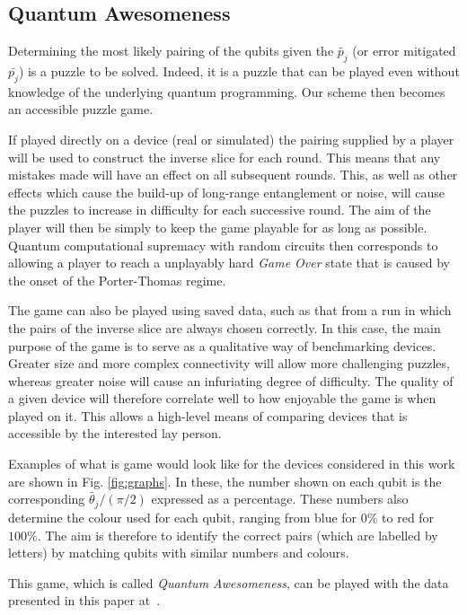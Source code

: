 \documentclass[aps,prl,twocolumn,showpacs,preprintnumbers]{revtex4-1}
\begin{document}
\subsection{Quantum Awesomeness}

Determining the most likely pairing of the qubits given the $\tilde{p_j}$ (or error mitigated $\bar{p_j}$) is a puzzle to be solved. Indeed, it is a puzzle that can be played even without knowledge of the underlying quantum programming. Our scheme then becomes an accessible puzzle game.

If played directly on a device (real or simulated) the pairing supplied by a player will be used to construct the inverse slice for each round. This means that any mistakes made will have an effect on all subsequent rounds. This, as well as other effects which cause the build-up of long-range entanglement or noise, will cause the puzzles to increase in difficulty for each successive round. The aim of the player will then be simply to keep the game playable for as long as possible. Quantum computational supremacy with random circuits then corresponds to allowing a player to reach a unplayably hard \textit{Game Over} state that is caused by the onset of the Porter-Thomas regime.

The game can also be played using saved data, such as that from a run in which the pairs of the inverse slice are always chosen correctly. In this case, the main purpose of the game is to serve as a qualitative way of benchmarking devices. Greater size and more complex connectivity will allow more challenging puzzles, whereas greater noise will cause an infuriating degree of difficulty. The quality of a given device will therefore correlate well to how enjoyable the game is when played on it. This allows a high-level means of comparing devices that is accessible by the interested lay person.

Examples of what is game would look like for the devices considered in this work are shown in Fig. \ref{fig:graphs}. In these, the number shown on each qubit is the corresponding $\tilde{\theta_j} / (\pi/2)$ expressed as a percentage. These numbers also determine the colour used for each qubit, ranging from blue for $0\%$ to red for $100\%$. The aim is therefore to identify the correct pairs (which are labelled by letters) by matching qubits with similar numbers and colours.

This game, which is called \textit{Quantum Awesomeness}, can be played with the data presented in this paper at~\cite{awesomeness}.
\end{document}
